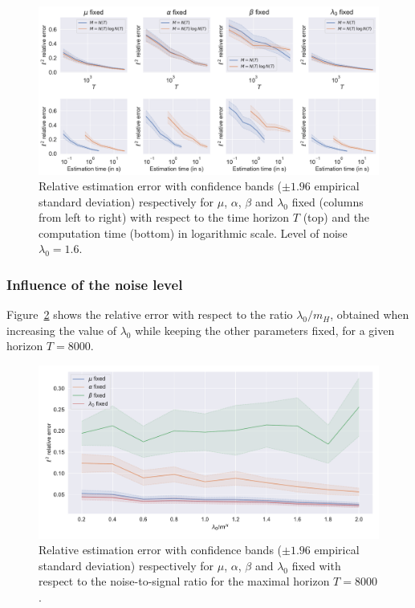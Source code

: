     \begin{figure}[!ht]
        \centering
        \includegraphics[width=\textwidth]{images/chapter4//l2_error_wrt_nbpoints.pdf}
        \caption{Relative estimation error with confidence bands ($\pm 1.96$ empirical standard deviation) respectively for \(\mu\), \(\alpha\), \(\beta\) and \(\lambda_0\) fixed (columns from left to right)
        with respect to the time horizon $T$ (top) and the computation time (bottom) in logarithmic scale. Level of noise $\lambda_0 = 1.6$.}
        \label{fig:chap3_errors_wrt_T}
    \end{figure}
  



    \subsubsection{Influence of the noise level}\label{sec:chap3_influence_noise}
       Figure~\ref{fig:chap3_errors_wrt_noise_N} shows the relative error with respect to the ratio $\lambda_0/m_H$, obtained when increasing the value of $\lambda_0$ while keeping the other parameters fixed, for a given horizon $T=8000$.

       \begin{figure}[!ht]
        \centering
        \includegraphics[width=\textwidth]{images/chapter4//vector_max_hor_wrt_noise_N.pdf}
        \caption{Relative estimation error with confidence bands ($\pm 1.96$ empirical standard deviation) respectively for \(\mu\), \(\alpha\), \(\beta\) and \(\lambda_0\) fixed 
        with respect to the noise-to-signal ratio for the maximal horizon $T=8000$.} 
        \label{fig:chap3_errors_wrt_noise_N}
        \end{figure}
        
